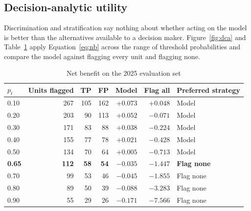 \documentclass[sn-vancouver,Numbered]{sn-jnl}
\begin{document}
\subsection{Decision-analytic utility}\label{sec:dca}

Discrimination and stratification say nothing about whether acting on the model is better than the alternatives available to a decision maker. Figure~\ref{fig:dca} and Table~\ref{tab:dca} apply Equation~\ref{eq:nb} across the range of threshold probabilities and compare the model against flagging every unit and flagging none.

\begin{table}[h]
\caption{Net benefit on the 2025 evaluation set}\label{tab:dca}
\begin{tabular}{lrrrrrl}
\toprule
$p_t$ & Units flagged & TP & FP & Model & Flag all & Preferred strategy \\
\midrule
0.10 & 267 & 105 & 162 & $+0.073$ & $+0.048$ & Model \\
0.20 & 203 & 90 & 113 & $+0.052$ & $-0.071$ & Model \\
0.30 & 171 & 83 & 88 & $+0.038$ & $-0.224$ & Model \\
0.40 & 155 & 77 & 78 & $+0.021$ & $-0.428$ & Model \\
0.50 & 134 & 70 & 64 & $+0.005$ & $-0.713$ & Model \\
\textbf{0.65} & \textbf{112} & \textbf{58} & \textbf{54} & $\mathbf{-0.035}$ & $-1.447$ & \textbf{Flag none} \\
0.70 & 99 & 53 & 46 & $-0.045$ & $-1.855$ & Flag none \\
0.80 & 89 & 50 & 39 & $-0.088$ & $-3.283$ & Flag none \\
0.90 & 55 & 29 & 26 & $-0.171$ & $-7.566$ & Flag none \\
\bottomrule
\end{tabular}
\end{table}
\end{document}
